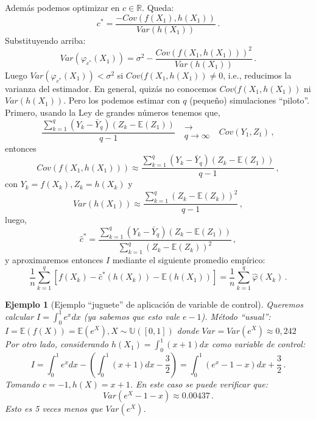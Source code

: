 \documentclass[letterpaper,11pt]{article} %
\theoremstyle{defbreak}
\newtheorem{example}{Ejemplo}[subsection]
\theoremstyle{propbreak}
\theoremstyle{remark}
\theoremstyle{break}
\def\R{\mathbb{R}}
\def\E{\mathbb{E}}
\def\unif{\mathbb{U}([0,1])}
\def\var{Var}
\begin{document}
Además podemos optimizar en $c\in\R$. Queda:
$$ c^*=\displaystyle\frac{-Cov(f(X_1),h(X_1))}{\var(h(X_1))} \, .$$
Substituyendo arriba:
$$ \var(\varphi_{c^*}(X_1))=\sigma^2-\displaystyle\frac{Cov(f(X_1,h(X_1)))^2}{\var(h(X_1))} \, .$$
Luego $\var(\varphi_{c^*}(X_1))<\sigma^2$ si $Cov(f(X_1,h(X_1))\neq 0$, i.e., reducimos la varianza del estimador.
\newp En general, quizás no conocemos $Cov(f(X_1,h(X_1))$ ni $\var(h(X_1))$. Pero los podemos estimar con $q$ (pequeño) simulaciones ``piloto''. Primero, usando la Ley de grandes números tenemos que,
$$ \displaystyle\frac{\sum_{k=1}^q(Y_k-\bar{Y}_q)(Z_k-\E(Z_1))}{q-1} \mbox{ }\substack{\longrightarrow \\ q\to\infty}\mbox{ } Cov(Y_1,Z_1) \, ,$$
entonces
$$ Cov(f(X_1,h(X_1)))\approx \displaystyle\frac{\sum_{k=1}^q(Y_k-\bar{Y}_q)(Z_k-\E(Z_1))}{q-1} \, ,$$
con $Y_k=f(X_k),Z_k=h(X_k)$ y 
$$\var(h(X_1))\approx \displaystyle\frac{\sum_{k=1}^q(Z_k-\E(Z_k))^2}{q-1} \, ,$$
luego,
$$ \hat{c}^*=\displaystyle\frac{\sum_{k=1}^q(Y_k-\bar{Y}_q)(Z_k-\E(Z_1))}{\sum_{k=1}^q(Z_k-\E(Z_k))^2} \, ,$$
y aproximaremos entonces $I$ mediante el siguiente promedio empírico:
$$ \displaystyle \frac{1}{n}\sum^q_{k=1}[f(X_k)-\hat{c}^*(h(X_k))-\E(h(X_1))]=\frac{1}{n}\sum^q_{k=1}\hat{\varphi}(X_k) \, .$$
\begin{example}[Ejemplo ``juguete'' de aplicación de variable de control]
Queremos calcular $I=\int^1_0e^xdx$ (ya sabemos que esto vale $e-1$).
\newp Método ``usual'': $I=\E(f(X))=\E(e^X),X\sim \unif$ donde $\var=\var(e^X)\approx0,242$
\newp Por otro lado, considerando $h(X_1)=\int^1_0(x+1)dx$ como variable de control:
$$ I=\int^1_0e^xdx - (\int^1_0(x+1)dx-\frac{3}{2})=\int^1_0(e^x-1-x)dx+\frac{3}{2} \, .$$
Tomando $c=-1,h(X)=x+1$. En este caso se puede verificar que:
$$ \var(e^X-1-x)\approx0.00437 \, .$$
Esto es 5 veces menos que $Var(e^X)$.
\end{example}
\end{document}
